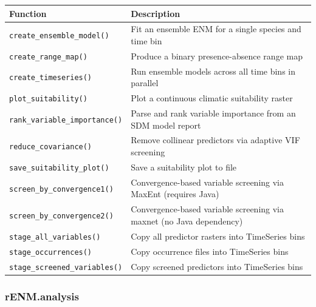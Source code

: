 \documentclass[
  letterpaper,
  DIV=11,
  numbers=noendperiod]{scrartcl}
\newcounter{none} %
\begin{document}
{\def\LTcaptype{none} %
\begin{longtable}[]{@{}
  >{\raggedright\arraybackslash}p{}
  >{\raggedright\arraybackslash}p{}@{}}
\toprule\noalign{}
\begin{minipage}[b]{\linewidth}\raggedright
Function
\end{minipage} & \begin{minipage}[b]{\linewidth}\raggedright
Description
\end{minipage} \\
\midrule\noalign{}
\endhead
\bottomrule\noalign{}
\endlastfoot
\texttt{create\_ensemble\_model()} & Fit an ensemble ENM for a single
species and time bin \\
\texttt{create\_range\_map()} & Produce a binary presence-absence range
map \\
\texttt{create\_timeseries()} & Run ensemble models across all time bins
in parallel \\
\texttt{plot\_suitability()} & Plot a continuous climatic suitability
raster \\
\texttt{rank\_variable\_importance()} & Parse and rank variable
importance from an SDM model report \\
\texttt{reduce\_covariance()} & Remove collinear predictors via adaptive
VIF screening \\
\texttt{save\_suitability\_plot()} & Save a suitability plot to file \\
\texttt{screen\_by\_convergence1()} & Convergence-based variable
screening via MaxEnt (requires Java) \\
\texttt{screen\_by\_convergence2()} & Convergence-based variable
screening via maxnet (no Java dependency) \\
\texttt{stage\_all\_variables()} & Copy all predictor rasters into
TimeSeries bins \\
\texttt{stage\_occurrences()} & Copy occurrence files into TimeSeries
bins \\
\texttt{stage\_screened\_variables()} & Copy screened predictors into
TimeSeries bins \\
\end{longtable}
}

\subsubsection{rENM.analysis}\label{renm.analysis}
\end{document}
